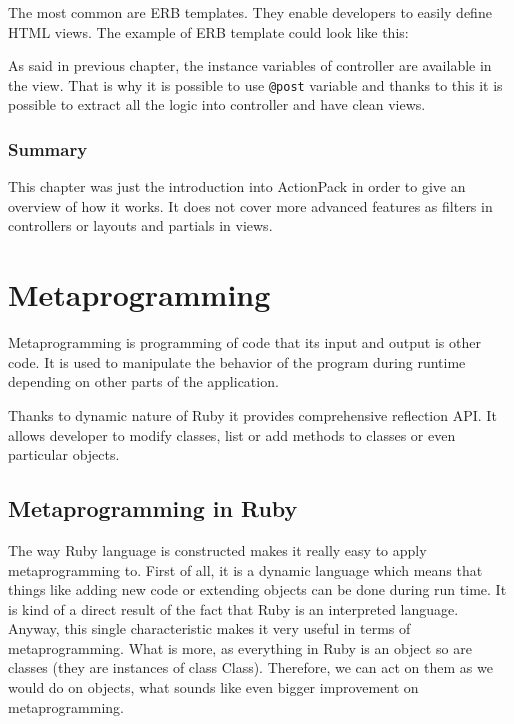       The most common are ERB templates. They enable developers to easily define
      HTML views. The example of ERB template could look like this:
      
      
      
      As said in previous chapter, the instance variables of controller are available in the view.
      That is why it is possible to use \texttt{@post} variable and thanks to this it is possible to 
      extract all the logic into controller and have clean views.
      
      \subsubsection{Summary}
      This chapter was just the introduction into ActionPack in order to give an overview of how 
      it works. It does not cover more advanced features as filters in controllers or layouts
      and partials in views.
      
  \section{Metaprogramming}
  Metaprogramming is programming of code that its input and output is other code. It is used to 
  manipulate the behavior of the program during runtime depending on other parts of the application.

  Thanks to dynamic nature of Ruby it provides comprehensive reflection API. It allows developer
  to modify classes, list or add methods to classes or even particular objects.
    
    \subsection{Metaprogramming in Ruby}
      The way Ruby language is constructed makes it really easy to apply metaprogramming to. First of   
      all, it is a dynamic language which means that things like adding new code or extending objects 
      can be done during run time. It is kind of a direct result of the fact that
      Ruby is an interpreted language. Anyway, this single characteristic makes it very useful in
      terms of metaprogramming. What is more, as everything in Ruby is an object so are classes 
      (they are instances of class Class). Therefore, we can act on them as we would do on objects, 
      what sounds like even bigger improvement on metaprogramming.
    
